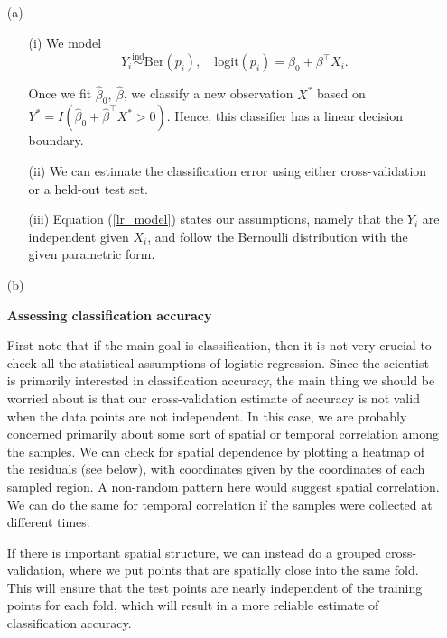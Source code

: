 \begin{enumerate}
\item[(a)]
\begin{enumerate}
\item[(i)] We model 
\begin{equation}\label{lr_model}
Y_i \overset{\text{ind}}\sim \text{Ber}(p_i), \quad \text{logit}(p_i) = \beta_0 + \beta^\top X_i.
\end{equation}

Once we fit $\hat \beta_0, \ \hat \beta$, we classify a new observation $X^*$ based on $Y^* = I(\hat \beta_0 + \hat \beta^\top X^* > 0)$. Hence, this classifier has a linear decision boundary.
	  			  		
\item[(ii)] We can estimate the classification error using either cross-validation or a held-out test set.
	  			  		
\item[(iii)] Equation (\ref{lr_model}) states our assumptions, namely that the $Y_i$ are independent given $X_i$, and follow the Bernoulli distribution with the given parametric form.
	  		
\end{enumerate}

\item[(b)] 

{\bf Assessing classification accuracy}

First note that if the main goal is classification, then it is not very crucial to check all the statistical assumptions of logistic regression. Since the scientist is primarily interested in classification accuracy, the main thing we should be worried about is that our cross-validation estimate of accuracy is not valid when the data points are not independent. In this case, we are probably concerned primarily about some sort of spatial or temporal correlation among the samples. We can check for spatial dependence by plotting a heatmap of the residuals (see below), with coordinates given by the coordinates of each sampled region. A non-random pattern here would suggest spatial correlation. We can do the same for temporal correlation if the samples were collected at different times.

If there is important spatial structure, we can instead do a grouped cross-validation, where we put points that are spatially close into the same fold. This will ensure that the test points are nearly independent of the training points for each fold, which will result in a more reliable estimate of classification accuracy.


\end{enumerate}
